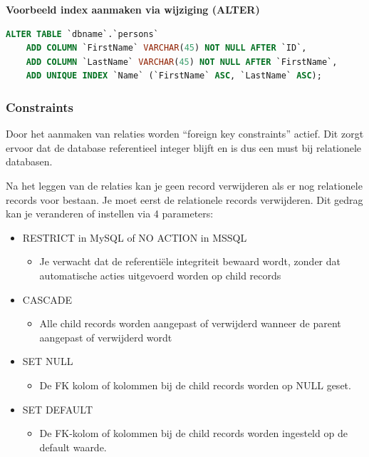 \documentclass{article}
\newcommand{\bold}[1]{\textbf{#1}}
\begin{document}
\bold{Voorbeeld index aanmaken via wijziging (ALTER)}

\begin{lstlisting}[language=SQL]
ALTER TABLE `dbname`.`persons`
    ADD COLUMN `FirstName` VARCHAR(45) NOT NULL AFTER `ID`,
    ADD COLUMN `LastName` VARCHAR(45) NOT NULL AFTER `FirstName`,
    ADD UNIQUE INDEX `Name` (`FirstName` ASC, `LastName` ASC);
\end{lstlisting}

\subsubsection{Constraints}
Door het aanmaken van relaties worden “foreign key constraints” actief. 
Dit zorgt ervoor dat de database referentieel integer blijft en is dus een must bij relationele databasen.

Na het leggen van de relaties kan je geen record verwijderen als er nog relationele records voor bestaan. 
Je moet eerst de relationele records verwijderen. Dit gedrag kan je veranderen of instellen via 4 parameters:

\begin{itemize}
    \item RESTRICT in MySQL of NO ACTION in MSSQL
    \begin{itemize}
        \item Je verwacht dat de referentiële integriteit bewaard wordt, zonder dat automatische acties uitgevoerd worden op child records
    \end{itemize}
    \item CASCADE
    \begin{itemize}
        \item Alle child records worden aangepast of verwijderd wanneer de parent aangepast of verwijderd wordt
    \end{itemize}
    \item SET NULL
    \begin{itemize}
        \item De FK kolom of kolommen bij de child records worden op NULL geset.
    \end{itemize}
    \item SET DEFAULT
    \begin{itemize}
        \item De FK-kolom of kolommen bij de child records worden ingesteld op de default waarde.
    \end{itemize}
\end{itemize}
\end{document}
